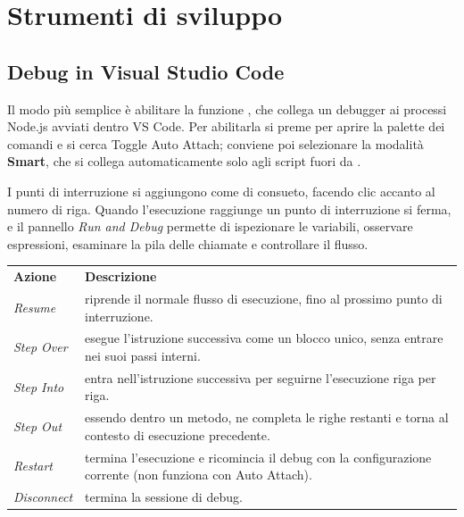\section{Strumenti di sviluppo}

\subsection{Debug in Visual Studio Code}

Il modo più semplice è abilitare la funzione , che collega un
debugger ai processi Node.js avviati dentro VS Code. Per abilitarla si preme
 per aprire la palette dei comandi e si cerca
\guillemotleft Toggle Auto Attach\guillemotright; conviene poi selezionare la modalità
\textbf{Smart}, che si collega automaticamente solo agli script fuori da
.

I punti di interruzione si aggiungono come di consueto, facendo clic accanto al
numero di riga. Quando l'esecuzione raggiunge un punto di interruzione si ferma,
e il pannello \textit{Run and Debug} permette di ispezionare le variabili,
osservare espressioni, esaminare la pila delle chiamate e controllare il flusso.

\begin{center}
\renewcommand{\arraystretch}{1.4}
\begin{tabular}{@{}l@{\hspace{1.0cm}}>{\raggedright\arraybackslash}p{9.0cm}@{}}
  \textbf{Azione} & \textbf{Descrizione} \\
  \textit{Resume}     & riprende il normale flusso di esecuzione, fino al
                        prossimo punto di interruzione. \\
  \textit{Step Over}  & esegue l'istruzione successiva come un blocco unico,
                        senza entrare nei suoi passi interni. \\
  \textit{Step Into}  & entra nell'istruzione successiva per seguirne
                        l'esecuzione riga per riga. \\
  \textit{Step Out}   & essendo dentro un metodo, ne completa le righe restanti
                        e torna al contesto di esecuzione precedente. \\
  \textit{Restart}    & termina l'esecuzione e ricomincia il debug con la
                        configurazione corrente (non funziona con Auto Attach). \\
  \textit{Disconnect} & termina la sessione di debug. \\
\end{tabular}
\end{center}

